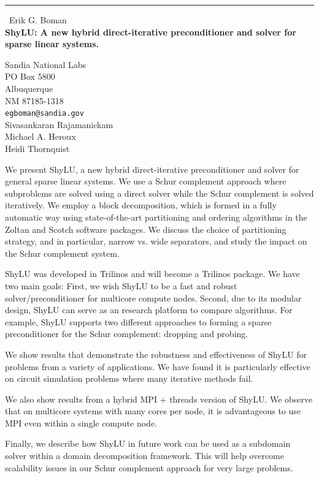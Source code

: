 \documentclass{report}
\begin{document}
\begin{center}
\rule{6in}{1pt} \
{\large Erik G. Boman \\
{\bf ShyLU: A new hybrid direct-iterative preconditioner and solver for sparse linear systems.}}

Sandia National Labs \\ PO Box 5800 \\ Albuquerque \\ NM 87185-1318
\\
{\tt egboman@sandia.gov}\\
Sivasankaran Rajamanickam\\
Michael A. Heroux\\
Heidi Thornquist\end{center}

We present ShyLU, a new hybrid direct-iterative preconditioner and solver
for general sparse linear systems.
We use a Schur complement approach where subproblems are solved using a
direct solver while the Schur complement is solved iteratively.
We employ a block decomposition, which is formed in a fully automatic way
using state-of-the-art partitioning and ordering algorithms in
the Zoltan and Scotch software packages. We discuss the choice of
partitioning strategy, and in particular, narrow vs. wide separators,
and study the impact on the Schur complement system.

ShyLU was developed in Trilinos and will become a Trilinos package.
We have two main goals: First, we wish ShyLU to be a fast and robust
solver/preconditioner for multicore compute nodes. Second, due to its
modular design, ShyLU can serve as an research platform to compare
algorithms. For example, ShyLU supports two different approaches
to forming a sparse preconditioner for the Schur complement:
dropping and probing.

We show results that demonstrate the robustness and effectiveness
of ShyLU for problems from a variety of applications. We have found
it is particularly effective on circuit simulation problems where
many iterative methods fail.

We also show results from a hybrid MPI + threads version of ShyLU.
We observe that on multicore systems with many cores per node, it
is advantageous to use MPI even within a single compute node.

Finally, we describe how ShyLU in future work can be used as a
subdomain solver within a domain decomposition framework. This
will help overcome scalability issues in our Schur complement approach
for very large problems.
\end{document}
